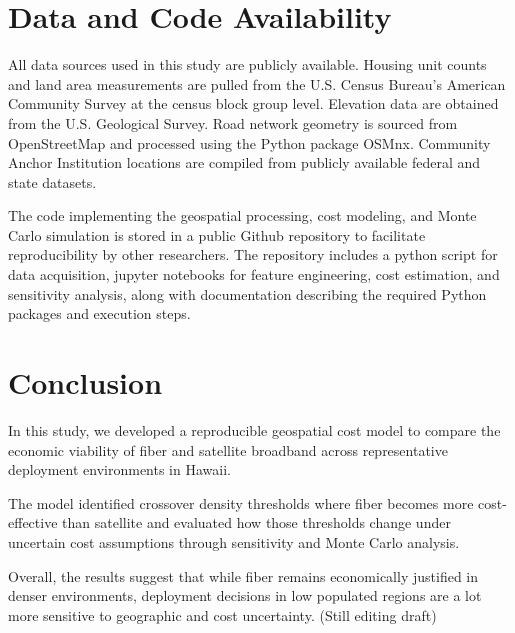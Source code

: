 \documentclass[conference]{IEEEtran}
\begin{document}
\section{Data and Code Availability}

All data sources used in this study are publicly available. Housing unit counts and land area measurements are pulled from the U.S. Census Bureau’s American Community Survey at the census block group level. Elevation data are obtained from the U.S. Geological Survey. Road network geometry is sourced from OpenStreetMap and processed using the Python package OSMnx. Community Anchor Institution locations are compiled from publicly available federal and state datasets.

The code implementing the geospatial processing, cost modeling, and Monte Carlo simulation is stored in a public Github repository to facilitate reproducibility by other researchers. The repository includes a python script for data acquisition, jupyter notebooks for feature engineering, cost estimation, and sensitivity analysis, along with documentation describing the required Python packages and execution steps.

\section{Conclusion}
In this study, we developed a reproducible geospatial cost model to compare the economic viability of fiber and satellite broadband across representative deployment environments in Hawaii. 

The model identified crossover density thresholds where fiber becomes more cost-effective than satellite and evaluated how those thresholds change under uncertain cost assumptions through sensitivity and Monte Carlo analysis. 

Overall, the results suggest that while fiber remains economically justified in denser environments, deployment decisions in low populated regions are a lot more sensitive to geographic and cost uncertainty. (Still editing draft)




\end{document}

